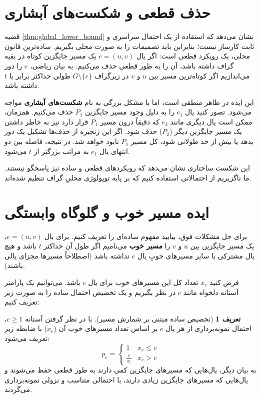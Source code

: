 \documentclass[11pt,a4paper]{report}
\theoremstyle{plain}
\theoremstyle{definition}
\newtheorem{defn}[thm]{\normalsize تعریف}
\theoremstyle{remark}
\begin{document}
\section{حذف قطعی و شکست‌های آبشاری}
قضیه \ref{thm:global_lower_bound} نشان می‌دهد که استفاده از یک احتمال سراسری و ثابت کارساز نیست؛ بنابراین باید تصمیمات را به صورت محلی بگیریم. ساده‌ترین قانون محلی، یک رویکرد قطعی است: اگر یال $e = (u,v)$ یک مسیر جایگزین کوتاه در بقیه گراف داشته باشد، آن را به طور قطعی حذف می‌کنیم. به بیان ریاضی، $e$ را دور می‌اندازیم اگر کوتاه‌ترین مسیر بین $u$ و $v$ در زیرگراف $G \setminus \{e\}$ طولی حداکثر برابر با $t$ داشته باشد.

این ایده در ظاهر منطقی است، اما با مشکل بزرگی به نام \textbf{شکست‌های آبشاری} مواجه می‌شود. تصور کنید یال $e_1$ را به دلیل وجود مسیر جایگزین $P_1$ حذف می‌کنیم. همزمان، ممکن است یال دیگری مانند $e_2$ که دقیقاً درون مسیر $P_1$ قرار دارد نیز به خاطر داشتن یک مسیر جایگزین دیگر ($P_2$) حذف شود. اگر این زنجیره از حذف‌ها تشکیل یک دور بدهد یا بیش از حد طولانی شود، کل مسیر $P_1$ نابود خواهد شد. در نتیجه، فاصله بین دو انتهای یال $e_1$ به مراتب بزرگتر از $t$ می‌شود.

این شکست ساختاری نشان می‌دهد که رویکردهای قطعی و ساده نیز پاسخگو نیستند. ما ناگزیریم از احتمالاتی استفاده کنیم که بر پایه توپولوژی محلیِ گراف تنظیم شده‌اند.

\section{ایده مسیر خوب و گلوگاه وابستگی}
برای حل مشکلات فوق، بیایید مفهوم ساده‌ای را تعریف کنیم. برای یال $e=(u,v)$، یک مسیر جایگزین بین $u$ و $v$ را \textbf{مسیر خوب} می‌نامیم اگر طول آن حداکثر $t$ باشد و هیچ یال مشترکی با سایر مسیرهای خوبِ یال $e$ نداشته باشد (اصطلاحاً مسیرها مجزای یالی باشند).

فرض کنید $x_e$ تعداد کل این مسیرهای خوب برای یال $e$ باشد. می‌توانیم یک پارامتر آستانه دلخواه مانند $c$ در نظر بگیریم و یک تخصیص احتمال ساده را به صورت زیر تعریف کنیم:

\begin{defn}[تخصیص ساده مبتنی بر شمارش مسیر]
با در نظر گرفتن آستانه $c \ge 1$، احتمال نمونه‌برداری از هر یال $e$ بر اساس تعداد مسیرهای خوب آن ($x_e$) با ضابطه زیر تعریف می‌شود:
\[ 
p_e = \begin{cases} 
1 & x_e \le c \\ 
\frac{c}{x_e} & x_e > c 
\end{cases} 
\]
به بیان دیگر، یال‌هایی که مسیرهای جایگزین کمی دارند به طور قطعی حفظ می‌شوند و یال‌هایی که مسیرهای جایگزین زیادی دارند، با احتمالی متناسب و نزولی نمونه‌برداری می‌گردند.
\end{defn}
\end{document}
